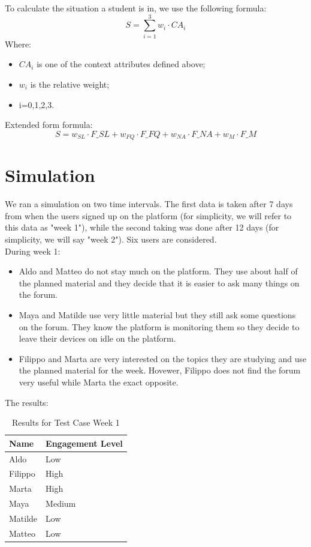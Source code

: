 To calculate the situation a student is in, we use the following formula:
\[ 
S = \sum_{i=1}^3  w_i \cdot CA_i  
\]
Where:
\begin{itemize}
    \item $CA_i$ is one of the context attributes defined above;
    \item $w_i$ is the relative weight;
    \item i=0,1,2,3.
\end{itemize}
Extended form formula:
\[
S = w_{SL} \cdot F\_SL + w_{FQ} \cdot F\_FQ + w_{NA} \cdot F\_NA + w_M \cdot F\_M
\]

\section{Simulation}
We ran a simulation on two time intervals. The first data is taken after 7 days from when 
the users signed up on the platform (for simplicity, we will refer to this data as "week 1"), 
while the second taking was done after 12 days (for simplicity, we will say "week 2"). Six users 
are considered.\\
During week 1:
\begin{itemize}
    \item Aldo and Matteo do not stay much on the platform. They use about half of the planned 
    material and they decide that it is easier to ask many things on the forum.
    \item Maya and Matilde use very little material but they still ask some questions on the forum. 
    They know the platform is monitoring them so they decide to leave their devices on idle on the
     platform.
    \item Filippo and Marta are very interested on the topics they are studying and use the planned 
    material for the week. Hovewer, Filippo does not find the forum very useful while Marta the exact 
    opposite.
\end{itemize}

The results:\\
\vspace{1em}
\begin{table}[H]
\centering
\begin{tabular}{l l}
\toprule
Name     & Engagement Level \\
\midrule
Aldo     & Low \\
Filippo  & High \\
Marta    & High \\
Maya     & Medium \\
Matilde  & Low \\
Matteo   & Low \\
\bottomrule
\end{tabular}
\caption{Results for Test Case Week 1}
\end{table}
\vspace{1em}

